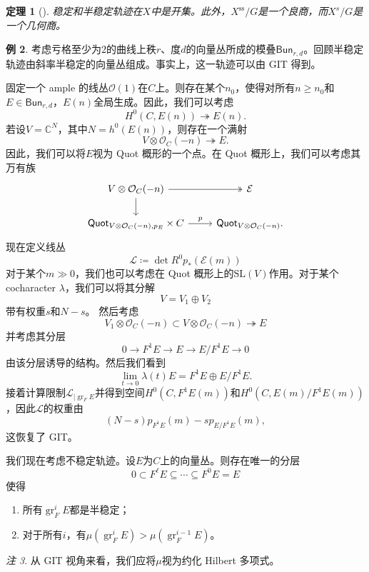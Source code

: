 \documentclass{amsart}
\newtheorem{thm}{定理}[section]
\theoremstyle{definition}
\newtheorem{exm}[thm]{例}
\theoremstyle{remark}
\newtheorem{rmk}[thm]{注}
\theoremstyle{plain}
\theoremstyle{definition}
\theoremstyle{remark}
\newcommand{\C}{\mathbb{C}}
\newcommand{\mc}[1]{\mathcal{#1}}
\newcommand{\mr}[1]{\mathrm{#1}}
\newcommand{\on}[1]{\operatorname{#1}}
\newcommand{\ms}[1]{\mathsf{#1}}
\newcommand{\1}{\mathbf{1}}
\newcommand{\2}{\mathbf{2}}
\newcommand{\3}{\mathbf{3}}
\begin{document}
\begin{thm}[{\cite{MFK1994}}]
    稳定和半稳定轨迹在\(X\)中是开集。此外，\(X^{\on{ss}}/G\)是一个良商，而\(X^s/G\)是一个几何商。
\end{thm}

\begin{exm}
    考虑亏格至少为\(2\)的曲线上秩\(r\)、度\(d\)的向量丛所成的模叠\(\ms{Bun}_{r,d}\)。回顾半稳定轨迹由斜率半稳定的向量丛组成。事实上，这一轨迹可以由 GIT 得到。

固定一个 ample 的线丛\(\mc{O}(1)\)在\(C\)上。则存在某个\(n_0\)，使得对所有\(n \geq n_0\)和\(E \in \ms{Bun}_{r,d}\)，\(E(n)\)全局生成。因此，我们可以考虑
    \[ H^0(C, E(n)) \twoheadrightarrow E(n). \]
若设\(V = \C^N\)，其中\(N = h^0(E(n))\)，则存在一个满射
    \[ V \otimes \mc{O}_C(-n) \twoheadrightarrow E. \]
因此，我们可以将\(E\)视为 Quot 概形的一个点。在 Quot 概形上，我们可以考虑其万有族
    \begin{equation*}
    \begin{tikzcd}
        V \otimes \mc{O}_C(-n) \ar[twoheadrightarrow]{r} \ar{d} & \mc{E} \\
        \ms{Quot}_{V \otimes \mc{O}_C(-n), p_E} \times C \ar{r}{p} & \ms{Quot}_{V \otimes \mc{O}_C(-n)}.
    \end{tikzcd}
    \end{equation*}
现在定义线丛
    \[ \mc{L} \coloneqq \det R^0 p_* (\mc{E}(m)) \]
对于某个\(m \gg 0\)，我们也可以考虑在 Quot 概形上的\(\mr{SL}(V)\)作用。对于某个 cocharacter \(\lambda\)，我们可以将其分解
    \[ V = V_1 \oplus V_2 \]
带有权重\(s\)和\(N-s\)。
然后考虑
    \[ V_1 \otimes \mc{O}_C(-n) \subset V \otimes \mc{O}_C(-n) \twoheadrightarrow E \]
并考虑其分层
    \[ 0 \to F^1 E \to E \to E / F^1 E \to 0 \]
由该分层诱导的结构。然后我们看到
    \[ \lim_{t \to 0} \lambda(t) E = F^1 E \oplus E/F^1 E. \]
接着计算限制\(\mc{L}_{|\on{gr}_F E}\)并得到空间\(H^0(C, F^1 E(m))\)和\(H^0(C, E(m)/F^1 E(m))\)，因此\(\mc{L}\)的权重由
    \[ (N-s) p_{F^1 E}(m) - s p_{E/F^1 E}(m), \]
这恢复了 GIT。
\end{exm}

我们现在考虑不稳定轨迹。设\(E\)为\(C\)上的向量丛。则存在唯一的分层
\[ 0 \subset F^{\ell} E \subseteq \cdots \subseteq F^0 E = E \]
使得
\begin{enumerate}
    \item 所有\(\on{gr}_F^i E\)都是半稳定；
\item 对于所有\(i\)，有\(\mu(\on{gr}_F^i E) > \mu(\on{gr}_F^{i-1} E)\)。
\end{enumerate}
\begin{rmk}
从 GIT 视角来看，我们应将\(\mu\)视为约化 Hilbert 多项式。
\end{rmk}
\end{document}
